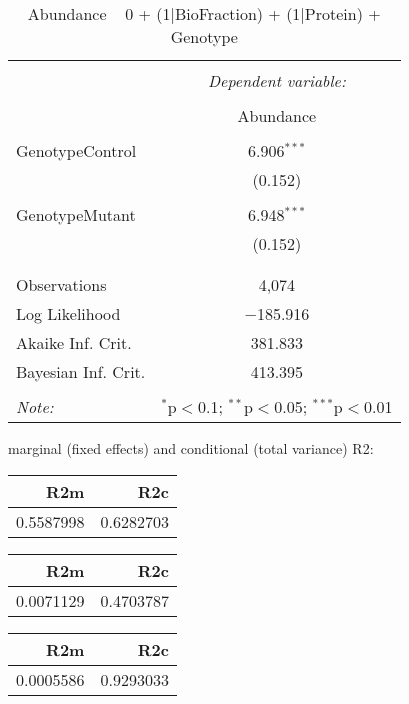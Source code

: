 \documentclass[11pt]{report}
\begin{document}
\begin{table}[!htbp] \centering 
  \caption{Abundance ~ 0 + (1|BioFraction) + (1|Protein) + Genotype} 
  \label{} 
\begin{tabular}{@{\extracolsep{5pt}}lc} 
\\[-1.8ex]\hline 
\hline \\[-1.8ex] 
 & \multicolumn{1}{c}{\textit{Dependent variable:}} \\ 
\cline{2-2} 
\\[-1.8ex] & Abundance \\ 
\hline \\[-1.8ex] 
 GenotypeControl & 6.906$^{***}$ \\ 
  & (0.152) \\ 
  & \\ 
 GenotypeMutant & 6.948$^{***}$ \\ 
  & (0.152) \\ 
  & \\ 
\hline \\[-1.8ex] 
Observations & 4,074 \\ 
Log Likelihood & $-$185.916 \\ 
Akaike Inf. Crit. & 381.833 \\ 
Bayesian Inf. Crit. & 413.395 \\ 
\hline 
\hline \\[-1.8ex] 
\textit{Note:}  & \multicolumn{1}{r}{$^{*}$p$<$0.1; $^{**}$p$<$0.05; $^{***}$p$<$0.01} \\ 
\end{tabular} 
\end{table} 
marginal (fixed effects) and conditional (total variance) R2:

\begin{tabular}{r|r}
\hline
R2m & R2c\\
\hline
0.5587998 & 0.6282703\\
\hline
\end{tabular}

\begin{tabular}{r|r}
\hline
R2m & R2c\\
\hline
0.0071129 & 0.4703787\\
\hline
\end{tabular}

\begin{tabular}{r|r}
\hline
R2m & R2c\\
\hline
0.0005586 & 0.9293033\\
\hline
\end{tabular}
\end{document}
